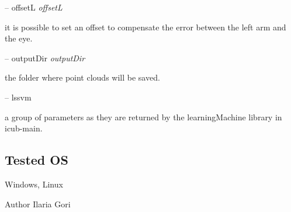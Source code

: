-- offset\+L {\itshape offset\+L} 
\begin{DoxyItemize}
\item it is possible to set an offset to compensate the error between the left arm and the eye.
\end{DoxyItemize}

-- output\+Dir {\itshape output\+Dir} 
\begin{DoxyItemize}
\item the folder where point clouds will be saved.
\end{DoxyItemize}

-- lssvm {\itshape } 
\begin{DoxyItemize}
\item a group of parameters as they are returned by the learning\+Machine library in icub-\/main.
\end{DoxyItemize}\hypertarget{group__handIKModule_tested_os_sec}{}\subsection{Tested O\+S}\label{group__handIKModule_tested_os_sec}
Windows, Linux

\begin{DoxyAuthor}{Author}
Ilaria Gori 
\end{DoxyAuthor}
